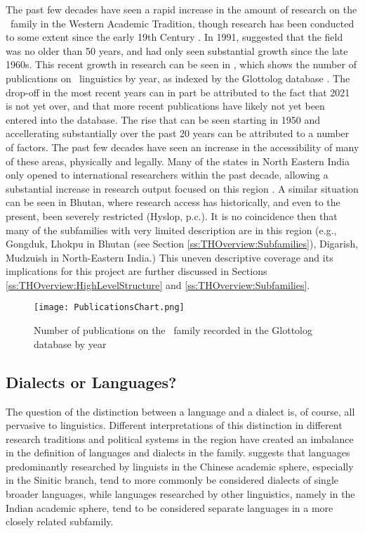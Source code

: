 The past few decades have seen a rapid increase in the amount of research on the \lfam\ family in the Western Academic Tradition, though research has been conducted to some extent since the early 19th Century \cite{VanDriem2014}. In 1991,  suggested that the field was no older than 50 years, and had only seen substantial growth since the late 1960s. This recent growth in research can be seen in , which shows the number of publications on \lfam\ linguistics by year, as indexed by the Glottolog database \cite{glottolog}. The drop-off in the most recent years can in part be attributed to the fact that 2021 is not yet over, and that more recent publications have likely not yet been entered into the database. The rise that can be seen starting in 1950 and accellerating substantially over the past 20 years can be attributed to a number of factors. The past few decades have seen an increase in the accessibility of many of these areas, physically and legally. Many of the states in North Eastern India only opened to international researchers within the past decade, allowing a substantial increase in research output focused on this region \cite{BlenchPost2014}. A similar situation can be seen in Bhutan, where research access has historically, and even to the present, been severely restricted (Hyslop, p.c.). It is no coincidence then that many of the subfamilies with very limited description are in this region (e.g., Gongduk, Lhokpu in Bhutan (see Section \ref{ss:THOverview:Subfamilies}), Digarish, Mudzuish in North-Eastern India.) This uneven descriptive coverage and its implications for this project are further discussed in Sections \ref{ss:THOverview:HighLevelStructure} and \ref{ss:THOverview:Subfamilies}.



\begin{figure}

\centering
\texttt{[image: PublicationsChart.png]}
\caption{Number of publications on the \lfam\ family recorded in the Glottolog database by year \cite{glottolog}}
\label{fig:PublicationsChart}
\end{figure}




\subsection{Dialects or Languages?}\label{s:DialectsorLanguages}
The question of the distinction between a language and a dialect is, of course, all pervasive to linguistics. Different interpretations of this distinction in different research traditions and political systems in the region have created an imbalance in the definition of languages and dialects in the family.  suggests that languages predominantly researched by linguists in the Chinese academic sphere, especially in the Sinitic branch, tend to more commonly be considered dialects of single broader languages, while languages researched by other linguistics, namely in the Indian academic sphere, tend to be considered separate languages in a more closely related subfamily.

